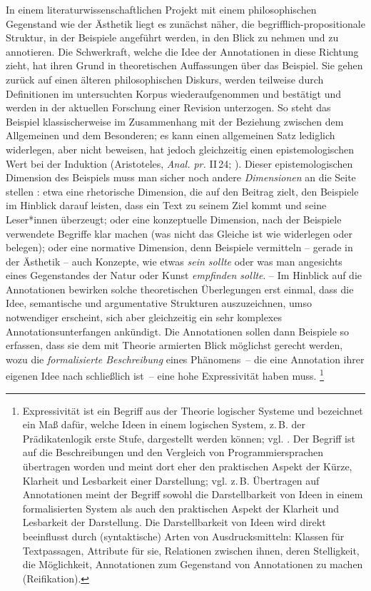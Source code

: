 \documentclass{article}
\renewcommand*{\see}{\autocap{v}gl\adddot}%
\begin{document}
In einem literaturwissenschaftlichen Projekt mit einem philosophischen
Gegenstand wie der Ästhetik liegt es zunächst näher, die
begrifflich-propositionale Struktur, in der Beispiele angeführt
werden, in den Blick zu nehmen und zu annotieren. Die Schwerkraft,
welche die Idee der Annotationen in diese Richtung zieht, hat ihren
Grund in theoretischen Auffassungen über das Beispiel. Sie gehen
zurück auf einen älteren philosophischen Diskurs, werden teilweise
durch Definitionen im untersuchten Korpus wiederaufgenommen und
bestätigt und werden in der aktuellen Forschung einer Revision
unterzogen. So steht das Beispiel klassischerweise im Zusammenhang mit
der Beziehung zwischen dem Allgemeinen und dem Besonderen; es kann
einen allgemeinen Satz lediglich widerlegen, aber nicht beweisen, hat
jedoch gleichzeitig einen epistemologischen Wert bei der Induktion %
(Aristoteles, \emph{Anal. pr.} II\,24; \cite[\see][]{Willer2007a}). %
Dieser epistemologischen Dimension des Beispiels muss man sicher noch
andere \emph{Dimensionen} an die Seite stellen \parencite{CL2013b}:
etwa eine rhetorische Dimension, die auf den Beitrag zielt, den
Beispiele im Hinblick darauf leisten, dass ein Text zu seinem Ziel
kommt und seine Leser*innen überzeugt; oder eine konzeptuelle
Dimension, nach der Beispiele verwendete Begriffe klar machen (was
nicht das Gleiche ist wie widerlegen oder belegen); oder eine
normative Dimension, denn Beispiele vermitteln -- gerade in der
Ästhetik -- auch Konzepte, wie etwas \emph{sein sollte} oder was man
angesichts eines Gegenstandes der Natur oder Kunst \emph{empfinden
  sollte}. -- Im Hinblick auf die Annotationen bewirken solche
theoretischen Überlegungen erst einmal, dass die Idee, semantische und
argumentative Strukturen auszuzeichnen, umso notwendiger erscheint,
sich aber gleichzeitig ein sehr komplexes Annotationsunterfangen
ankündigt. Die Annotationen sollen dann Beispiele so erfassen, dass
sie dem mit Theorie armierten Blick möglichst gerecht werden, wozu die
\emph{formalisierte Beschreibung} eines Phänomens~-- die eine
Annotation ihrer eigenen Idee nach schließlich ist~-- eine hohe
Expressivität haben muss.%
\footnote{Expressivität ist ein Begriff aus der Theorie logischer
  Systeme und bezeichnet ein Maß dafür, welche Ideen in einem
  logischen System, z.\,B. der Prädikatenlogik erste Stufe,
  dargestellt werden können; vgl. \cite{Beierle2014a}. Der Begriff ist
  auf die Beschreibungen und den Vergleich von Programmiersprachen
  übertragen worden und meint dort eher den praktischen Aspekt der
  Kürze, Klarheit und Lesbarkeit einer Darstellung;
  vgl. z.\,B. \cite[\pno\,308 u.\,ö.]{Sussman2001a} Übertragen auf
  Annotationen meint der Begriff sowohl die Darstellbarkeit von Ideen
  in einem formalisierten System als auch den praktischen Aspekt der
  Klarheit und Lesbarkeit der Darstellung. Die Darstellbarkeit von
  Ideen wird direkt beeinflusst durch (syntaktische) Arten von
  Ausdrucksmitteln: Klassen für Textpassagen, Attribute für sie,
  Relationen zwischen ihnen, deren Stelligkeit, die Möglichkeit,
  Annotationen zum Gegenstand von Annotationen zu machen
  (Reifikation).}
\end{document}
